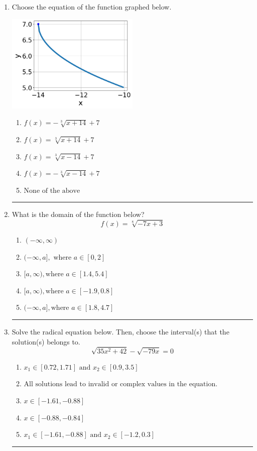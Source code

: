 \documentclass[14pt]{extbook}
\newcommand{\litem}[1]{\item#1\hspace*{-1cm}\rule{\textwidth}{0.4pt}}
\begin{document}
\begin{enumerate}
\litem{
Choose the equation of the function graphed below.
\begin{center}
    \includegraphics[width=0.5\textwidth]{../Figures/radicalGraphToEquationCopyC.png}
\end{center}
\begin{enumerate}[label=\Alph*.]
\item \( f(x) = - \sqrt[3]{x + 14} + 7 \)
\item \( f(x) = \sqrt[3]{x + 14} + 7 \)
\item \( f(x) = \sqrt[3]{x - 14} + 7 \)
\item \( f(x) = - \sqrt[3]{x - 14} + 7 \)
\item \( \text{None of the above} \)

\end{enumerate} }
\litem{
What is the domain of the function below?\[ f(x) = \sqrt[8]{-7 x + 3} \]\begin{enumerate}[label=\Alph*.]
\item \( (-\infty, \infty) \)
\item \( (-\infty, a], \text{ where } a \in [0, 2] \)
\item \( [a, \infty), \text{where } a \in [1.4, 5.4] \)
\item \( [a, \infty), \text{where } a \in [-1.9, 0.8] \)
\item \( (-\infty, a], \text{where } a \in [1.8, 4.7] \)

\end{enumerate} }
\litem{
Solve the radical equation below. Then, choose the interval(s) that the solution(s) belongs to.\[ \sqrt{35 x^2 + 42} - \sqrt{-79 x} = 0 \]\begin{enumerate}[label=\Alph*.]
\item \( x_1 \in [0.72, 1.71] \text{ and } x_2 \in [0.9,3.5] \)
\item \( \text{All solutions lead to invalid or complex values in the equation.} \)
\item \( x \in [-1.61,-0.88] \)
\item \( x \in [-0.88,-0.84] \)
\item \( x_1 \in [-1.61, -0.88] \text{ and } x_2 \in [-1.2,0.3] \)


\end{enumerate}}
\end{enumerate}
\end{document}
